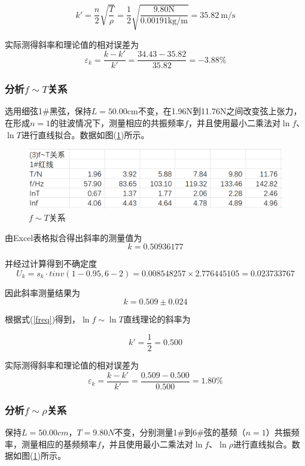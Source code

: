 \documentclass[a4paper,11pt]{article}
\begin{document}
                $$k' = \dfrac{n}{2}\sqrt{\dfrac{T}{\rho}} = \dfrac{1}{2}\sqrt{\dfrac{\text{9.80N}}{\text{0.00191kg/m}}} = 35.82~\text{m/s}$$

                实际测得斜率和理论值的相对误差为$$\varepsilon_k = \dfrac{k-k'}{k'} = \dfrac{34.43-35.82}{35.82} = -3.88\%$$

            \subsubsection{分析$f\sim T$关系}

                选用细弦1\#黑弦，保持$L=50.00$cm不变，在1.96N到11.76N之间改变弦上张力，在形成$n=1$的驻波情况下，测量相应的共振频率$f$，并且使用最小二乘法对$\ln f$、$\ln T$进行直线拟合。数据如图(\ref{data3})所示。
                
                \begin{figure}[ht]
                    \centering
                    \includegraphics[scale=0.7]{3.f~T关系.png}
                    \caption{$f\sim T$关系}
                    \label{data3}
                \end{figure}
                
                由Excel表格拟合得出斜率的测量值为$$k=0.50936177$$

                并经过计算得到不确定度$$U_k = s_k \cdot tinv(1-0.95, 6-2) = 0.008548257 \times 2.776445105 = 0.023733767$$

                因此斜率测量结果为$$k = 0.509 \pm 0.024$$

                根据式(\ref{freq})得到，$\ln f\sim \ln T$直线理论的斜率为

                $$k' = \dfrac 12 = 0.500$$

                实际测得斜率和理论值的相对误差为$$\varepsilon_k = \dfrac{k-k'}{k'} = \dfrac{0.509-0.500}{0.500} = 1.80\%$$

            \subsubsection{分析$f\sim \rho$关系}
                
                保持$L=50.00cm$，$T=9.80N$不变，分别测量1\#到6\#弦的基频（$n=1$）共振频率，测量相应的基频频率$f$，并且使用最小二乘法对$\ln f$、$\ln \rho$进行直线拟合。数据如图(\ref{data3})所示。
                
\end{document}
